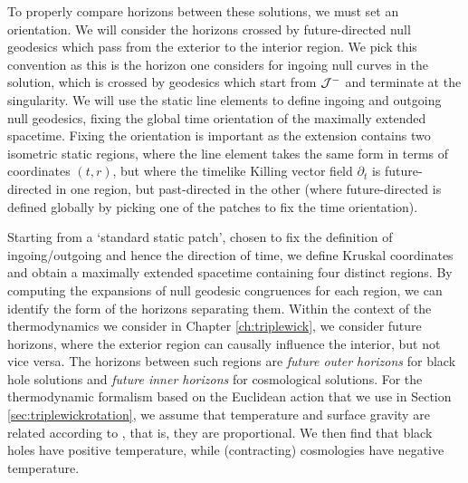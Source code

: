 To properly compare horizons between these solutions, we must set an orientation. We will consider the horizons crossed by future-directed null geodesics which pass from the exterior to the interior region. We pick this convention as this is the horizon one considers for ingoing null curves in the \sch solution, which is crossed by geodesics which start from ${\cal J}^-$ and terminate at the singularity. We will use the static line elements to define ingoing and outgoing null geodesics, fixing the global time orientation of the maximally extended spacetime. Fixing the orientation is important as the extension contains two isometric static regions, where the line element takes the same form in terms of coordinates $(t,r)$, but where the timelike Killing vector field $\partial_t$ is future-directed in one region, but past-directed in the other (where future-directed is defined globally by picking one of the patches to fix the time orientation). 

Starting from a `standard static patch', chosen to fix the definition of ingoing/outgoing and hence the direction of time, we define Kruskal coordinates and obtain a maximally extended spacetime containing four distinct regions. By computing the expansions of null geodesic congruences for each region, we can identify the form of the horizons separating them. Within the context of the thermodynamics we consider in Chapter \ref{ch:triplewick}, we consider future horizons, where the exterior region can causally influence the interior, but not vice versa. The horizons between such regions are  \emph{future outer horizons} for black hole solutions and \emph{future inner horizons} for cosmological solutions. For the thermodynamic formalism based on the Euclidean action that we use in Section \ref{sec:triplewickrotation}, we assume that temperature and surface gravity are related according to \cite{Binetruy:2014ela, Helou:2015zma}, that is, they are proportional. We then find that black holes have positive temperature, while (contracting) cosmologies have negative temperature. 

